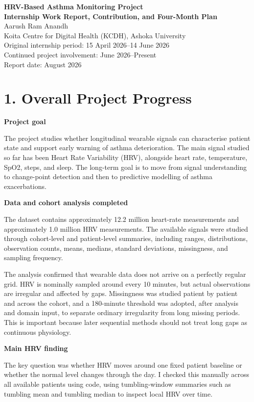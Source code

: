 \documentclass[10pt,a4paper]{article}
\begin{document}
\begin{center}
{\Large\bfseries HRV-Based Asthma Monitoring Project}\\
{\normalsize\bfseries Internship Work Report, Contribution, and Four-Month Plan}\\[0.35em]
Aarush Ram Anandh \\
Koita Centre for Digital Health (KCDH), Ashoka University \\
Original internship period: 15 April 2026--14 June 2026 \\
Continued project involvement: June 2026--Present \\
Report date: August 2026
\end{center}

\section{1. Overall Project Progress}

\textbf{Project goal}

The project studies whether longitudinal wearable signals can characterise patient state and support early warning of asthma deterioration. The main signal studied so far has been Heart Rate Variability (HRV), alongside heart rate, temperature, SpO2, steps, and sleep. The long-term goal is to move from signal understanding to change-point detection and then to predictive modelling of asthma exacerbations.

\textbf{Data and cohort analysis completed}

The dataset contains approximately 12.2 million heart-rate measurements and approximately 1.0 million HRV measurements. The available signals were studied through cohort-level and patient-level summaries, including ranges, distributions, observation counts, means, medians, standard deviations, missingness, and sampling frequency.

The analysis confirmed that wearable data does not arrive on a perfectly regular grid. HRV is nominally sampled around every 10 minutes, but actual observations are irregular and affected by gaps. Missingness was studied patient by patient and across the cohort, and a 180-minute threshold was adopted, after analysis and domain input, to separate ordinary irregularity from long missing periods. This is important because later sequential methods should not treat long gaps as continuous physiology.

\textbf{Main HRV finding}

The key question was whether HRV moves around one fixed patient baseline or whether the normal level changes through the day. I checked this manually across all available patients using code, using tumbling-window summaries such as tumbling mean and tumbling median to inspect local HRV over time.
\end{document}
